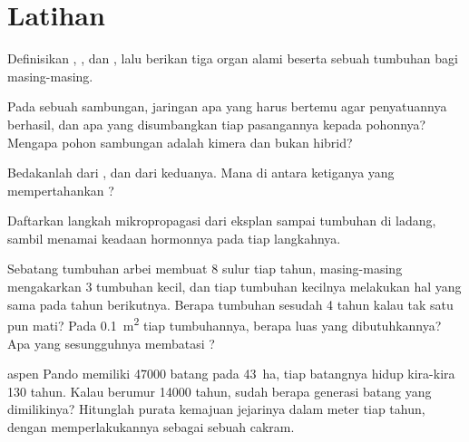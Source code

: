 \section{Latihan}

\begin{exercise}[$\star$]\label{exo:b2:asexual-reproduction:1}
Definisikan , , dan , lalu berikan tiga organ alami
 beserta sebuah tumbuhan bagi masing-masing.
\end{exercise}

\begin{exercise}[$\star$]\label{exo:b2:asexual-reproduction:2}
Pada sebuah sambungan, jaringan apa yang harus bertemu agar
penyatuannya berhasil, dan apa yang disumbangkan tiap pasangannya
kepada pohonnya? Mengapa pohon sambungan adalah kimera dan bukan hibrid?
\end{exercise}

\begin{exercise}[$\star$]\label{exo:b2:asexual-reproduction:3}
Bedakanlah  dari , dan
 dari keduanya. Mana di antara ketiganya yang
mempertahankan ?
\end{exercise}

\begin{exercise}[$\star$]\label{exo:b2:asexual-reproduction:4}
Daftarkan langkah mikropropagasi dari eksplan sampai tumbuhan di
ladang, sambil menamai keadaan hormonnya pada tiap langkahnya.
\end{exercise}

\begin{exercise}[$\star\star$]\label{exo:b2:asexual-reproduction:5}
Sebatang tumbuhan arbei membuat 8 sulur tiap tahun, masing-masing
mengakarkan 3 tumbuhan kecil, dan tiap tumbuhan kecilnya melakukan hal
yang sama pada tahun berikutnya. Berapa tumbuhan sesudah 4 tahun kalau
tak satu pun mati? Pada \qty{0.1}{m^2} tiap tumbuhannya, berapa luas
yang dibutuhkannya? Apa yang sesungguhnya membatasi ?
\end{exercise}

\begin{exercise}[$\star\star$]\label{exo:b2:asexual-reproduction:6}
 aspen Pando memiliki \num{47000} batang pada \qty{43}{ha}, tiap
batangnya hidup kira-kira \num{130} tahun. Kalau  berumur
\num{14000} tahun, sudah berapa generasi batang yang dimilikinya?
Hitunglah purata kemajuan jejarinya dalam meter tiap tahun, dengan
memperlakukannya sebagai sebuah cakram.
\end{exercise}

